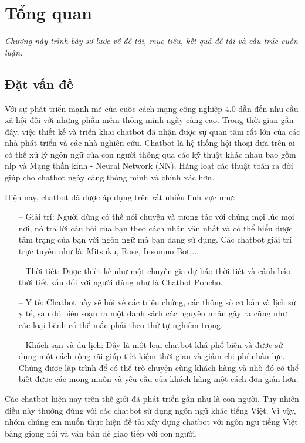 \chapter{Tổng quan}
\label{Chapter1}

\emph{Chương này trình bày sơ lược về đề tài, mục tiêu, kết quả đề tài và cấu trúc cuốn luận.}

\section{Đặt vấn đề}

Với sự phát triển mạnh mẽ của cuộc cách mạng công nghiệp 4.0 dẫn đến nhu cầu xã hội đối với những phần mềm thông minh ngày càng cao. Trong thời gian gần đây, việc thiết kế và triển khai chatbot đã nhận được sự quan tâm rất lớn của các nhà phát triển và các nhà nghiên cứu. Chatbot là hệ thống hội thoại dựa trên \ac{ai} có thể xử lý ngôn ngữ của con người thông qua các kỹ thuật khác nhau bao gồm \ac{nlp} và Mạng thần kinh - Neural Network (NN). Hàng loạt các thuật toán ra đời giúp cho chatbot ngày càng thông minh và chính xác hơn.

Hiện nay, chatbot đã được áp dụng trên rất nhiều lĩnh vực như:
\begin{itemize}
    \item[--] Giải trí: Người dùng có thể nói chuyện và tương tác với chúng mọi lúc mọi nơi, nó trả lời câu hỏi của bạn theo cách nhân văn nhất và có thể hiểu được tâm trạng của bạn với ngôn ngữ mà bạn đang sử dụng. Các chatbot giải trí trực tuyến như là: Mitsuku, Rose, Insomno Bot,...
    \item[--] Thời tiết: Được thiết kế như một chuyên gia dự báo thời tiết và cảnh báo thời tiết xấu đối với người dùng như là Chatbot Poncho.
    \item[--] Y tế: Chatbot này sẽ hỏi về các triệu chứng, các thông số cơ bản và lịch sử y tế, sau đó biên soạn ra một danh sách các nguyên nhân gây ra cũng như các loại bệnh có thể mắc phải theo thứ tự nghiêm trọng.
    \item[--] Khách sạn và du lịch: Đây là một loại chatbot khá phổ biến và được sử dụng một cách rộng rãi giúp tiết kiệm thời gian và giảm chi phí nhân lực. Chúng được lập trình để có thể trò chuyện cùng khách hàng và nhờ đó có thể biết được các mong muốn và yêu cầu của khách hàng một cách đơn giản hơn.
\end{itemize}

Các chatbot hiện nay trên thế giới đã phát triển gần như là con người. Tuy nhiên điều này thường đúng với các chatbot sử dụng ngôn ngữ khác tiếng Việt. Vì vậy, nhóm chúng em muốn thực hiện đề tài xây dựng chatbot với ngôn ngữ tiếng Việt bằng giọng nói và văn bản để giao tiếp với con người.

